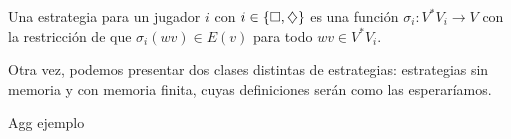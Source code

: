 \begin{definition}
	Una estrategia para un jugador $i$ con $i \in \{\square, \diamondsuit\}$ es una función $\sigma_i: V^*V_i \rightarrow V$ con la restricción de que $\sigma_i(wv) \in E(v)$ para todo $wv \in V^*V_i$.
\end{definition}

Otra vez, podemos presentar dos clases distintas de estrategias: estrategias
sin memoria y con memoria finita, cuyas definiciones serán como las
esperaríamos.

\begin{definition}

\end{definition}

\begin{definition}

\end{definition}

Agg ejemplo




